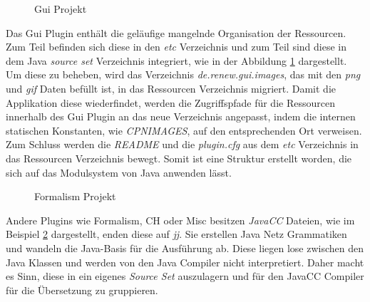 	\begin{figure}[h!]
		\centering
		\small
		\setlength{\DTbaselineskip}{7pt}
		\begin{minipage}{7cm}
		\end{minipage}
		\caption{Gui Projekt}
		\label{fig:gui}
	\end{figure}

	Das Gui Plugin enthält die geläufige mangelnde Organisation der Ressourcen. Zum Teil befinden sich diese in den \textit{etc} Verzeichnis und zum Teil sind diese in dem Java \textit{source set} Verzeichnis integriert, wie in der Abbildung \ref{fig:gui} dargestellt.\newline
	Um diese zu beheben, wird das Verzeichnis \textit{de.renew.gui.images}, das mit den \textit{png} und \textit{gif} Daten befüllt ist, in das Ressourcen Verzeichnis migriert. Damit die Applikation diese wiederfindet, werden die Zugriffspfade für die Ressourcen innerhalb des Gui Plugin an das neue Verzeichnis angepasst, indem die internen statischen Konstanten, wie \textit{CPNIMAGES}, auf den entsprechenden Ort verweisen. \newline
	Zum Schluss werden die \textit{README} und die \textit{plugin.cfg}  aus dem \textit{etc} Verzeichnis in das Ressourcen Verzeichnis bewegt. Somit ist eine Struktur erstellt worden, die sich auf das Modulsystem von Java anwenden lässt. \bigbreak

	\begin{figure}[h!]
		\centering
		\small
		\setlength{\DTbaselineskip}{7pt}
		\begin{minipage}{7cm}
		\end{minipage}
	  \caption{Formalism Projekt}
	  \label{fig:formalism}
	\end{figure}

	Andere Plugins wie Formalism, CH oder Misc besitzen \textit{JavaCC} Dateien, wie im Beispiel \ref{fig:formalism} dargestellt, enden diese auf \textit{jj}. Sie erstellen Java Netz Grammatiken und wandeln die Java-Basis für die Ausführung ab. Diese liegen lose zwischen den Java Klassen und werden von den Java Compiler nicht interpretiert. Daher macht es Sinn, diese in ein eigenes \textit{Source Set} auszulagern und für den JavaCC Compiler für die Übersetzung zu gruppieren.

